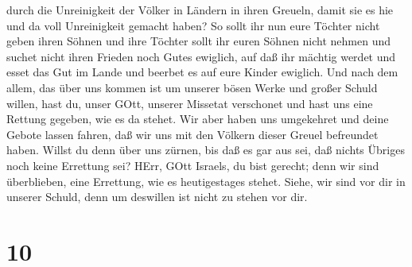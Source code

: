durch die Unreinigkeit der Völker in Ländern in ihren Greueln, damit sie
es hie und da voll Unreinigkeit gemacht haben?  So sollt
ihr nun eure Töchter nicht geben ihren Söhnen und ihre Töchter sollt ihr
euren Söhnen nicht nehmen und suchet nicht ihren Frieden noch Gutes
ewiglich, auf daß ihr mächtig werdet und esset das Gut im Lande und
beerbet es auf eure Kinder ewiglich.  Und nach dem allem,
das über uns kommen ist um unserer bösen Werke und großer Schuld willen,
hast du, unser GOtt, unserer Missetat verschonet und hast uns eine
Rettung gegeben, wie es da stehet.  Wir aber haben uns
umgekehret und deine Gebote lassen fahren, daß wir uns mit den Völkern
dieser Greuel befreundet haben. Willst du denn über uns zürnen, bis daß
es gar aus sei, daß nichts Übriges noch keine Errettung sei?
 HErr, GOtt Israels, du bist gerecht; denn wir sind
überblieben, eine Errettung, wie es heutigestages stehet. Siehe, wir
sind vor dir in unserer Schuld, denn um deswillen ist nicht zu stehen
vor dir.

\hypertarget{section-9}{%
\section{10}\label{section-9}}


